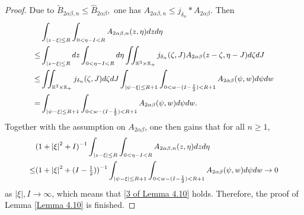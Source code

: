 \documentclass[reqno,11pt]{amsart}
\numberwithin{equation}{section}
\def\R{\mathbb{R}}
\begin{document}
\begin{proof}
Due to $\tilde{B}_{2\alpha \beta ,n}\leq \hat{B}_{2\alpha \beta},$ one has $A_{2\alpha \beta ,n } \leq j_{\delta_n}* A_{2\alpha \beta }.$ Then
\begin{equation*}{\small
\begin{aligned}
	&\int_{|z-\xi|\leq R} \int_{0< \eta -I <R } A_{2\alpha \beta ,n } (z,\eta )dzd\eta \\
	\leq& \int_{|z-\xi|\leq R}dz \int_{0< \eta -I <R } d\eta \iint_{\R^3\times \R_+} j_{\delta_n}(\zeta ,J) A_{2\alpha \beta } (z-\zeta ,\eta - J ) d\zeta dJ\\
	\leq & \iint_{\R^3\times \R_+} j_{\delta_n}(\zeta ,J) d\zeta dJ \int_{|\psi - \xi |\leq R+1} \int_{0< w -(I-\frac{1}{2}) <R +1} A_{2\alpha \beta }(\psi ,w) d\psi dw\\
	= & \int_{|\psi - \xi |\leq R+1} \int_{0< w -(I-\frac{1}{2}) <R+1 } A_{2\alpha \beta }(\psi ,w) d\psi dw.
\end{aligned}}
\end{equation*}
Together with the assumption on $A_{2 \alpha \beta}$, one then gains that for all $n\geq 1$,
\begin{equation*}{\small
\begin{aligned}
	& (1+|\xi|^2 + I )^{-1} \int_{|z-\xi |\leq R } \int_{0<\eta -I < R } A_{2\alpha \beta ,n } (z,\eta ) dzd\eta \\
	\leq & (1+|\xi|^2 + (I-\tfrac{1}{2}) )^{-1} \int_{|\psi - \xi |\leq R+1} \int_{0< w -(I-\frac{1}{2}) <R +1} A_{2\alpha \beta }(\psi , w) d\psi dw \rightarrow 0
\end{aligned}}
\end{equation*}
as $|\xi|, I \rightarrow \infty$, which means that \eqref{3 of Lemma 4.10} holds. Therefore, the proof of Lemma \ref{Lemma 4.10} is finished.
\end{proof}
\end{document}
